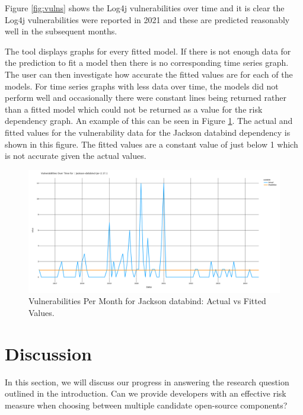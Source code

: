 \documentclass[conference]{IEEEtran}
\begin{document}
Figure \ref{fig:vulns} shows the Log4j vulnerabilities over time and it is clear the Log4j vulnerabilities were reported in 2021 and these are predicted reasonably well in the subsequent months. 

The tool displays graphs for every fitted model. If there is not enough data for the prediction to fit a model then there is no corresponding time series graph. The user can then investigate how accurate the fitted values are for each of the models. For time series graphs with less data over time, the models did not perform well and occasionally there were constant lines being returned rather than a fitted model which could not be returned as a value for the risk dependency graph. An example of this can be seen in Figure \ref{fig:const}. The actual and fitted values for the vulnerability data for the Jackson databind dependency \cite{noauthor_fasterxmljackson-databind_2024} is shown in this figure. The fitted values are a constant value of just below 1 which is not accurate given the actual values. 

\begin{figure}
    \centering
    \includegraphics[width=1\linewidth]{Const.png}
    \caption{Vulnerabilities Per Month for Jackson databind: Actual vs Fitted Values.} 
    \label{fig:const}
\end{figure}

\section{Discussion}
In this section, we will discuss our progress in answering the research question outlined in the introduction. Can we provide developers with an effective risk measure when choosing between multiple candidate open-source components?
\end{document}
